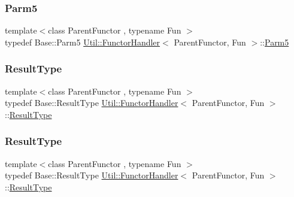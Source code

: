 \mbox{\label{classUtil_1_1FunctorHandler_aeb1492d58534bb15702063e862e459c6}} 
\subsubsection{\texorpdfstring{Parm5}{Parm5}\hspace{0.1cm}{\footnotesize\ttfamily [3/3]}}
{\footnotesize\ttfamily template$<$class Parent\+Functor , typename Fun $>$ \\
typedef Base\+::\+Parm5 \mbox{\hyperlink{classUtil_1_1FunctorHandler}{Util\+::\+Functor\+Handler}}$<$ Parent\+Functor, Fun $>$\+::\mbox{\hyperlink{classUtil_1_1FunctorHandler_aeb1492d58534bb15702063e862e459c6}{Parm5}}}

\mbox{\label{classUtil_1_1FunctorHandler_a036da44b8cc2567704cebd2a20d16c80}} 
\subsubsection{\texorpdfstring{ResultType}{ResultType}\hspace{0.1cm}{\footnotesize\ttfamily [1/3]}}
{\footnotesize\ttfamily template$<$class Parent\+Functor , typename Fun $>$ \\
typedef Base\+::\+Result\+Type \mbox{\hyperlink{classUtil_1_1FunctorHandler}{Util\+::\+Functor\+Handler}}$<$ Parent\+Functor, Fun $>$\+::\mbox{\hyperlink{classUtil_1_1FunctorHandler_a036da44b8cc2567704cebd2a20d16c80}{Result\+Type}}}

\mbox{\label{classUtil_1_1FunctorHandler_a036da44b8cc2567704cebd2a20d16c80}} 
\subsubsection{\texorpdfstring{ResultType}{ResultType}\hspace{0.1cm}{\footnotesize\ttfamily [2/3]}}
{\footnotesize\ttfamily template$<$class Parent\+Functor , typename Fun $>$ \\
typedef Base\+::\+Result\+Type \mbox{\hyperlink{classUtil_1_1FunctorHandler}{Util\+::\+Functor\+Handler}}$<$ Parent\+Functor, Fun $>$\+::\mbox{\hyperlink{classUtil_1_1FunctorHandler_a036da44b8cc2567704cebd2a20d16c80}{Result\+Type}}}

